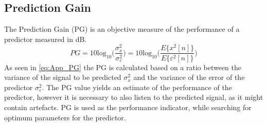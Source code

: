 \subsection{Prediction Gain}
The Prediction Gain (PG) is an objective measure of the performance of a predictor measured in dB. 
\begin{equation}\label{eq:App_PG}
PG = 10 \mathrm{log}_{10}\bigg(\frac{\sigma^2_x}{\sigma^2_\varepsilon}\bigg) = 10 \mathrm{log}_{10}\bigg(\frac{E\{x^2[n]\}}{E\{\varepsilon^2[n]\}}\bigg)
\end{equation}
As seen in \autoref{eq:App_PG} the PG is calculated based on a ratio between the variance of the signal to be predicted $\sigma^2_x$ and the variance of the error of the predictor $\sigma^2_\varepsilon$. The PG value yields an estimate of the performance of the predictor, however it is necessary to also listen to the predicted signal, as it might contain artefacts. PG is used as the performance indicator, while searching for optimum parameters for the predictor.  


%	

%	





















